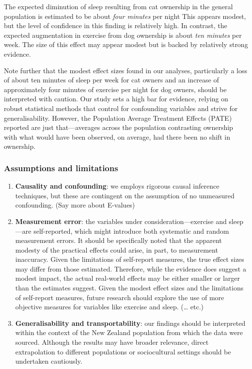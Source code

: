 \documentclass[
  singlecolumn,
  9pt]{article}
\begin{document}
The expected diminution of sleep resulting from cat ownership in the
general population is estimated to be about \emph{four minutes} per
night This appears modest, but the level of confidence in this finding
is relatively high. In contrast, the expected augmentation in exercise
from dog ownership is about \emph{ten minutes} per week. The size of
this effect may appear modest but is backed by relatively strong
evidence.

Note further that the modest effect sizes found in our analyses,
particularly a loss of about ten minutes of sleep per week for cat
owners and an increase of approximately four minutes of exercise per
night for dog owners, should be interpreted with caution. Our study sets
a high bar for evidence, relying on robust statistical methods that
control for confounding variables and strive for generalisability.
However, the Population Average Treatment Effects (PATE) reported are
just that---averages across the population contrasting ownership with
what would have been observed, on average, had there been no shift in
ownership.

\subsubsection{Assumptions and
limitations}\label{assumptions-and-limitations}

\begin{enumerate}
\def\labelenumi{\arabic{enumi}.}
\item
  \textbf{Causality and confounding}: we employs rigorous causal
  inference techniques, but these are contingent on the assumption of no
  unmeasured confounding. (Say more about E-values)
\item
  \textbf{Measurement error}: the variables under
  consideration---exercise and sleep---are self-reported, which might
  introduce both systematic and random measurement errors. It should be
  specifically noted that the apparent modesty of the practical effects
  could arise, in part, to measurement inaccuracy. Given the limitations
  of self-report measures, the true effect sizes may differ from those
  estimated. Therefore, while the evidence does suggest a modest impact,
  the actual real-world effects may be either smaller or larger than the
  estimates suggest. Given the modest effect sizes and the limitations
  of self-report measures, future research should explore the use of
  more objective measures for variables like exercise and sleep.
  (\ldots{} etc.)
\item
  \textbf{Generalisability and transportability}: our findings should be
  interpreted within the context of the New Zealand population from
  which the data were sourced. Although the results may have broader
  relevance, direct extrapolation to different populations or
  sociocultural settings should be undertaken cautiously.
\end{enumerate}
\end{document}
